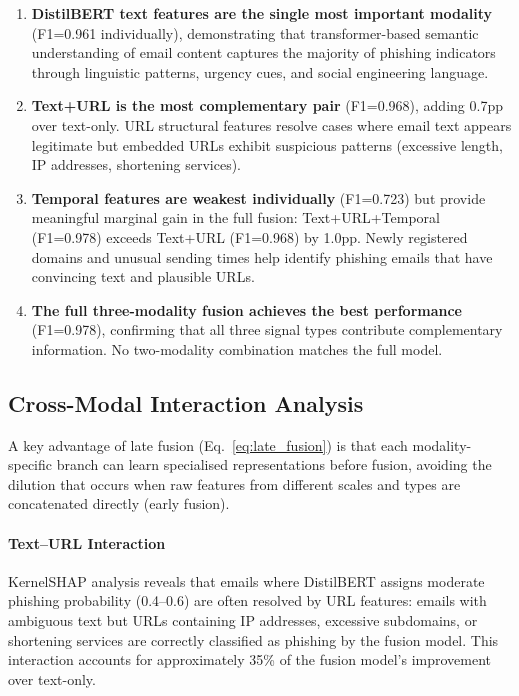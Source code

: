 \documentclass[conference]{IEEEtran}
\begin{document}
\begin{enumerate}[leftmargin=*,itemsep=2pt]
  \item \textbf{DistilBERT text features are the single most important modality} (F1=0.961 individually), demonstrating that transformer-based semantic understanding of email content captures the majority of phishing indicators through linguistic patterns, urgency cues, and social engineering language.
  \item \textbf{Text+URL is the most complementary pair} (F1=0.968), adding 0.7pp over text-only. URL structural features resolve cases where email text appears legitimate but embedded URLs exhibit suspicious patterns (excessive length, IP addresses, shortening services).
  \item \textbf{Temporal features are weakest individually} (F1=0.723) but provide meaningful marginal gain in the full fusion: Text+URL+Temporal (F1=0.978) exceeds Text+URL (F1=0.968) by 1.0pp. Newly registered domains and unusual sending times help identify phishing emails that have convincing text and plausible URLs.
  \item \textbf{The full three-modality fusion achieves the best performance} (F1=0.978), confirming that all three signal types contribute complementary information. No two-modality combination matches the full model.
\end{enumerate}

\subsection{Cross-Modal Interaction Analysis}
\label{subsec:cross_modal}

A key advantage of late fusion (Eq.~\ref{eq:late_fusion}) is that each
modality-specific branch can learn specialised representations before
fusion, avoiding the dilution that occurs when raw features from different
scales and types are concatenated directly (early fusion).

\paragraph{Text--URL Interaction}
KernelSHAP analysis reveals that emails where DistilBERT assigns moderate
phishing probability (0.4--0.6) are often resolved by URL features: emails
with ambiguous text but URLs containing IP addresses, excessive subdomains,
or shortening services are correctly classified as phishing by the fusion
model. This interaction accounts for approximately 35\% of the fusion
model's improvement over text-only.
\end{document}
